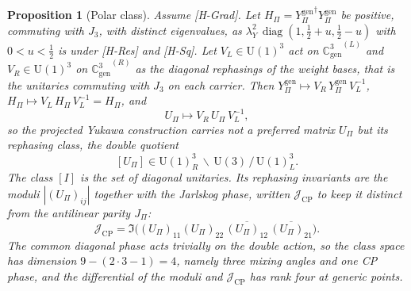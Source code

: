 \documentclass[11pt]{article}
\newtheorem{proposition}{Proposition}
\theoremstyle{definition}
\theoremstyle{remark}
\newcommand{\JPi}{J_{\Pi}}
\newcommand{\Jthree}{J_{3}}
\newcommand{\Cgen}{\mathbb{C}^{3}_{\mathrm{gen}}}
\newcommand{\GL}{{\Cgen}^{(L)}}
\newcommand{\GR}{{\Cgen}^{(R)}}
\newcommand{\Ygen}{{Y^{\mathrm{gen}}_{\Pi}}}
\newcommand{\JCP}{\mathcal{J}_{\mathrm{CP}}}
\newcommand{\Hpi}{H_{\Pi}}
\newcommand{\Upi}{U_{\Pi}}
\newcommand{\lamY}{\lambda_{Y}}
\newcommand{\UU}{\mathrm{U}}
\newcommand{\diag}{\operatorname{diag}}
\begin{document}
    \begin{proposition}[Polar class]
      \label{prop:polar-class}
      Assume [H-Grad].
      Let $\Hpi = \Ygen^{\dagger}\Ygen$ be positive, commuting with $\Jthree$, with distinct eigenvalues, as
      $\lamY^{2}\,\diag(1, \tfrac12 + u, \tfrac12 - u)$ with $0 < u < \tfrac12$ is under [H-Res] and [H-Sq].
      Let $V_{L} \in \UU(1)^{3}$ act on $\GL$ and $V_{R} \in \UU(1)^{3}$ on $\GR$ as the diagonal rephasings of the
      weight bases, that is the unitaries commuting with $\Jthree$ on each carrier.
      Then $\Ygen \mapsto V_{R}\,\Ygen\,V_{L}^{-1}$, $\Hpi \mapsto V_{L}\,\Hpi\,V_{L}^{-1} = \Hpi$, and
      \[
        \Upi \longmapsto V_{R}\,\Upi\,V_{L}^{-1} ,
      \]
      so the projected Yukawa construction carries not a preferred matrix $\Upi$ but its rephasing class, the
      double quotient
      \[
        [\Upi] \in \UU(1)^{3}_{R} \,\backslash\, \UU(3) \,/\, \UU(1)^{3}_{L} .
      \]
      The class $[I]$ is the set of diagonal unitaries.
      Its rephasing invariants are the moduli $|(\Upi)_{ij}|$ together with the Jarlskog phase, written $\JCP$ to
      keep it distinct from the antilinear parity $\JPi$:
      \[
        \JCP = \Im\!\big( (\Upi)_{11}(\Upi)_{22}\,\overline{(\Upi)_{12}}\,\overline{(\Upi)_{21}} \big) .
      \]
      The common diagonal phase acts trivially on the double action, so the class space has dimension
      $9 - (2\cdot 3 - 1) = 4$, namely three mixing angles and one CP phase, and the differential of the moduli and
      $\JCP$ has rank four at generic points.
    \end{proposition}
\end{document}
